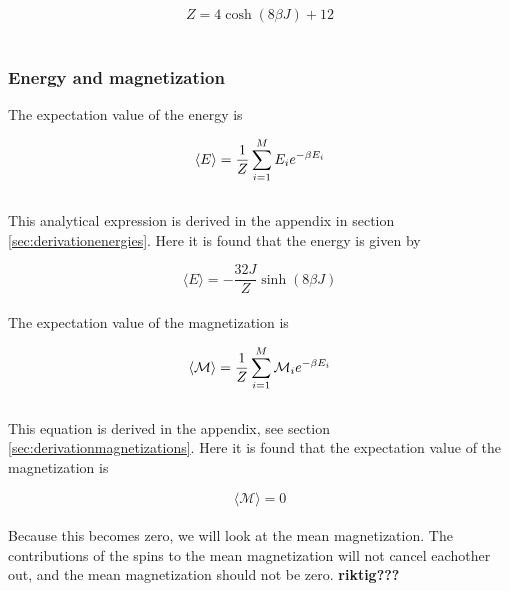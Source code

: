 \documentclass{article}
\begin{document}
\begin{equation} \label{eq:finalpartitionfunction}
    Z = 4 \cosh(8 \beta J) + 12
\end{equation} \\


\subsubsection{Energy and magnetization} \label{sec:energyandmagnetization}

The expectation value of the energy is

\begin{equation}    \label{eq:expectationenergy}
    \langle E \rangle = \frac{1}{Z} \sum _{i=1} ^M E_i e^{- \beta E_i} \\
\end{equation} \\

This analytical expression is derived in the appendix in section \ref{sec:derivationenergies}. Here it is found that the energy is given by

\begin{equation} \label{eq:finalenergy}
    \langle E \rangle = - \frac{32 J}{Z} \sinh(8 \beta J)
\end{equation} \\

The expectation value of the magnetization is

\begin{equation}    \label{eq:magnetization}
    \langle \mathcal{M} \rangle = \frac{1}{Z} \sum _{i=1} ^M \mathcal{M}_i e^{- \beta E_i} \\
\end{equation} \\

This equation is derived in the appendix, see section \ref{sec:derivationmagnetizations}. Here it is found that the expectation value of the magnetization is

\begin{equation} \label{eq:finalmagnetization}
    \langle \mathcal{M} \rangle = 0
\end{equation} \\

Because this becomes zero, we will look at the mean magnetization. The contributions of the spins to the mean magnetization will not cancel eachother out, and the mean magnetization should not be zero. \textbf{riktig???} \\
\end{document}
